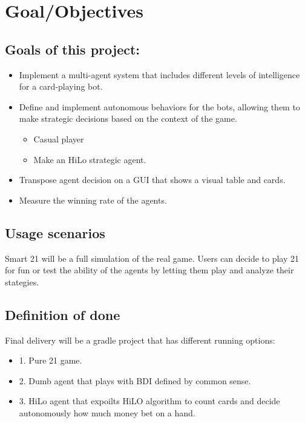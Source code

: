 \chapter{Goal/Objectives}
\label{ch:goal} %
\section{Goals of this project:}
\begin{itemize}
    \item Implement a multi-agent system that includes different levels of intelligence for a card-playing bot.
    \item Define and implement autonomous behaviors for the bots, allowing them to make strategic decisions based on the context of the game.
    \begin{itemize}
        \item Casual player
        \item Make an HiLo strategic agent.
    \end{itemize}
    \item Transpose agent decision on a GUI that shows a visual table and cards.
    \item Measure the winning rate of the agents.
\end{itemize}

\section{Usage scenarios}

Smart 21 will be a full simulation of the real game. Users can decide to play 21 for fun or test the ability of the agents by letting them play and analyze their stategies.  

\section{Definition of done}

Final delivery will be a gradle project that has different running options:

\begin{itemize}
    \item 1. Pure 21 game.
    \item 2. Dumb agent that plays with BDI defined by common sense.
    \item 3. HiLo agent that expoilts HiLO algorithm to count cards and decide autonomously how much money bet on a hand.
\end{itemize}

